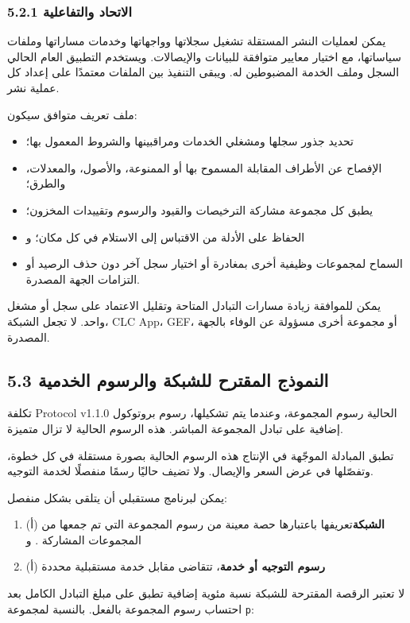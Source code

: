 \documentclass[11pt]{article}
\begin{document}
\subsubsection*{5.2.1 الاتحاد والتفاعلية}

يمكن لعمليات النشر المستقلة تشغيل سجلاتها وواجهاتها وخدمات مساراتها وملفات سياساتها، مع اختيار معايير متوافقة للبيانات والإيصالات. ويستخدم التطبيق العام الحالي السجل وملف الخدمة المضبوطين له. ويبقى التنفيذ بين الملفات معتمدًا على إعداد كل عملية نشر.

ملف تعريف متوافق سيكون:

\begin{itemize}[leftmargin=*]
\item تحديد جذور سجلها ومشغلي الخدمات ومراقبينها والشروط المعمول بها؛
\item الإفصاح عن الأطراف المقابلة المسموح بها أو الممنوعة، والأصول، والمعدلات، والطرق؛
\item يطبق كل مجموعة مشاركة الترخيصات والقيود والرسوم وتقييدات المخزون؛
\item الحفاظ على الأدلة من الاقتباس إلى الاستلام في كل مكان؛ و
\item السماح لمجموعات وظيفية أخرى بمغادرة أو اختيار سجل آخر دون حذف الرصيد أو التزامات الجهة المصدرة.
\end{itemize}
يمكن للموافقة زيادة مسارات التبادل المتاحة وتقليل الاعتماد على سجل أو مشغل واحد. لا تجعل الشبكة، CLC App، GEF، أو مجموعة أخرى مسؤولة عن الوفاء بالجهة المصدرة.

\subsection*{5.3 النموذج المقترح للشبكة والرسوم الخدمية}

تكلفة Protocol v1.1.0 الحالية رسوم المجموعة، وعندما يتم تشكيلها، رسوم بروتوكول إضافية على تبادل المجموعة المباشر. هذه الرسوم الحالية لا تزال متميزة.

تطبق المبادلة الموجّهة في الإنتاج هذه الرسوم الحالية بصورة مستقلة في كل خطوة، وتفصّلها في عرض السعر والإيصال. ولا تضيف حاليًا رسمًا منفصلًا لخدمة التوجيه.

يمكن لبرنامج مستقبلي أن يتلقى بشكل منفصل:

\begin{enumerate}[leftmargin=*]
\item (أ) \textbf{الشبكة}تعريفها باعتبارها حصة معينة من رسوم المجموعة التي تم جمعها من المجموعات المشاركة . و
\item (أ) \textbf{رسوم التوجيه أو خدمة}، تتقاضى مقابل خدمة مستقبلية محددة
\end{enumerate}
لا تعتبر الرقصة المقترحة للشبكة نسبة مئوية إضافية تطبق على مبلغ التبادل الكامل بعد احتساب رسوم المجموعة بالفعل. بالنسبة لمجموعة \texttt{p}:
\end{document}
